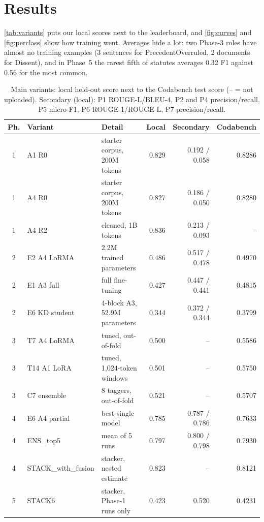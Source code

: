 \documentclass[11pt, oneside]{article}
\begin{document}
\section{Results}
\autoref{tab:variants} puts our local scores next to the leaderboard, and \autoref{fig:curves} and
\autoref{fig:perclass} show how training went.  Averages hide a lot: two Phase-3 roles have almost no training
examples (3 sentences for PrecedentOverruled, 2 documents for Dissent), and in Phase~5 the rarest fifth of
statutes averages 0.32 F1 against 0.56 for the most common.

\begin{table}[!t]\centering\footnotesize
\caption{Main variants: local held-out score next to the Codabench test score (-- = not uploaded).  Secondary
(local): P1 ROUGE-L/BLEU-4, P2 and P4 precision/recall, P5 micro-F1, P6 ROUGE-1/ROUGE-L, P7 precision/recall.}\label{tab:variants}
\scriptsize\begin{tabularx}{\linewidth}{clXrrr}\toprule
Ph. & Variant & Detail & Local & Secondary & Codabench\\\midrule
1 & A1 R0 & starter corpus, 200M tokens & 0.829 & 0.192 / 0.058 & 0.8286\\
1 & A4 R0 & starter corpus, 200M tokens & 0.827 & 0.186 / 0.050 & 0.8280\\
1 & A4 R2 & cleaned, 1B tokens & 0.836 & 0.213 / 0.093 & --\\
2 & E2 A4 LoRMA & 2.2M trained parameters & 0.486 & 0.517 / 0.478 & 0.4970\\
2 & E1 A3 full & full fine-tuning & 0.427 & 0.447 / 0.441 & 0.4815\\
2 & E6 KD student & 4-block A3, 52.9M parameters & 0.344 & 0.372 / 0.344 & 0.3799\\
3 & T7 A4 LoRMA & tuned, out-of-fold & 0.500 & -- & 0.5586\\
3 & T14 A1 LoRA & tuned, 1,024-token windows & 0.501 & -- & 0.5750\\
3 & C7 ensemble & 8 taggers, out-of-fold & 0.521 & -- & 0.5707\\
4 & E6 A4 partial & best single model & 0.785 & 0.787 / 0.786 & 0.7633\\
4 & ENS\_top5 & mean of 5 runs & 0.797 & 0.800 / 0.798 & 0.7930\\
4 & STACK\_with\_fusion & stacker, nested estimate & 0.823 & -- & 0.8121\\
5 & STACK6 & stacker, Phase-1 runs only & 0.423 & 0.520 & 0.4231\\

\end{tabularx}
\end{table}
\end{document}
